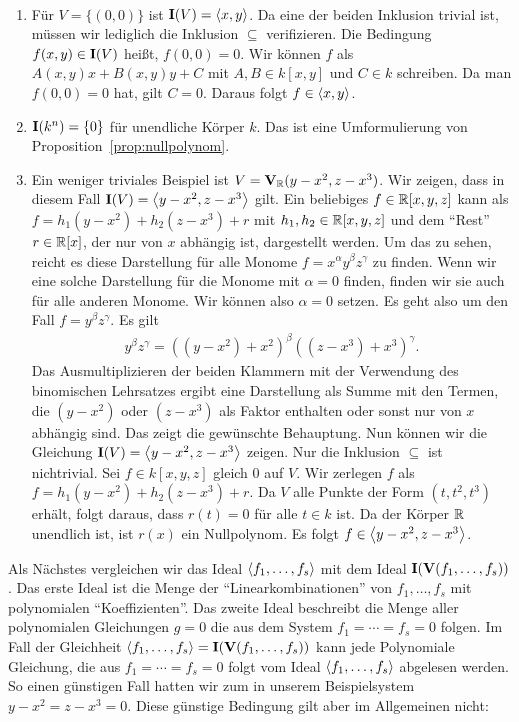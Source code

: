 \documentclass[11pt]{article}
\numberwithin{equation}{section}
\begin{document}
\begin{beispiele}{\ } 
\begin{enumerate}
	\item Für $V = \{(0,0) \}$ ist $\mathbf{I}(V) = \left< x,y \right>$. Da eine der beiden Inklusion trivial ist,  müssen wir lediglich die Inklusion $\subseteq$ verifizieren. Die Bedingung $f(x,y) \in \mathbf{I}(V)$ heißt, $f(0,0)=0$. Wir können $f$ als $A(x,y)x + B(x,y) y + C$ mit $A,B \in k[x,y]$ und $C \in k$ schreiben. Da man $f(0,0) =0$ hat, gilt $C=0$. Daraus folgt $f \in \left< x,y \right>$. 
	\item $\mathbf{I}(k^n) =\{0\}$ für unendliche Körper $k$. Das ist eine Umformulierung von Proposition~\ref{prop:nullpolynom}.  
	\item Ein weniger triviales Beispiel ist $V = \mathbf{V}_{\mathbb{R}}(y-x^2, z -x^3)$. Wir zeigen, dass in diesem Fall $\mathbf{I}(V) = \left< y - x^2, z - x^3 \right>$ gilt. Ein beliebiges $f \in \mathbb{R}[x,y,z]$ kann als $f = h_1 (y-x^2)+ h_2 (z-x^3) + r$ mit $h_1,h_2 \in \mathbb{R}[x,y,z]$ und dem ``Rest'' $r \in \mathbb{R}[x]$, der nur von $x$ abhängig ist, dargestellt werden. Um das zu sehen, reicht es diese Darstellung für alle Monome $f = x^\alpha y^\beta z^\gamma$ zu finden. Wenn wir eine solche Darstellung für die Monome mit $\alpha =0$ finden, finden wir sie auch für alle anderen Monome. Wir können also $\alpha =0$ setzen. Es geht also um den Fall $f = y^\beta z^\gamma$. Es gilt 
	\begin{align*}
			y^\beta z^\gamma = ((y-x^2) + x^2)^\beta ( (z-x^3) + x^3)^\gamma. 
	\end{align*}
	Das Ausmultiplizieren der beiden Klammern mit der Verwendung des binomischen Lehrsatzes ergibt eine Darstellung als Summe mit den Termen, die $(y-x^2)$ oder $(z-x^3)$ als Faktor enthalten oder sonst nur von $x$ abhängig sind. Das zeigt die gewünschte Behauptung. Nun können wir 
	die Gleichung $\mathbf{I}(V)= \left< y-x^2, z- x^3 \right>$ zeigen. Nur die Inklusion $\subseteq$ ist nichtrivial. Sei $f \in k[x,y,z]$ gleich $0$ auf $V$. Wir zerlegen $f$ als $f = h_1 (y-x^2) + h_2(z-x^3) + r$. Da $V$ alle Punkte der Form $(t,t^2,t^3)$ erhält, folgt daraus, dass $r(t)=0$ für alle $t \in k$ ist. Da der Körper $\mathbb{R}$ unendlich ist, ist $r(x)$ ein Nullpolynom. Es folgt $f \in \left< y-x^2,z-x^3 \right>$. 
\end{enumerate} 
\end{beispiele} 

Als Nächstes vergleichen wir das Ideal $\left< f_1,\ldots,f_s \right>$ mit dem Ideal $\mathbf{I}(\mathbf{V}(f_1,\ldots,f_s))$.  Das erste Ideal ist die Menge der ``Linearkombinationen'' von $f_1,\ldots,f_s$ mit polynomialen ``Koeffizienten''. Das zweite Ideal beschreibt die Menge aller polynomialen Gleichungen $g =0$ die aus dem System $f_1 =\cdots = f_s=0$ folgen.  
Im Fall der Gleichheit $\left< f_1,\ldots,f_s \right> = \mathbf{I}(\mathbf{V}(f_1,\ldots,f_s))$ kann jede Polynomiale Gleichung, die aus $f_1 = \cdots = f_s =0$ folgt vom Ideal $\left< f_1,\ldots,f_s \right>$ abgelesen werden. So einen günstigen Fall hatten wir zum in unserem Beispielsystem $y - x^2 = z-x^3 =0$. Diese günstige Bedingung gilt aber im Allgemeinen nicht: 
\end{document}
